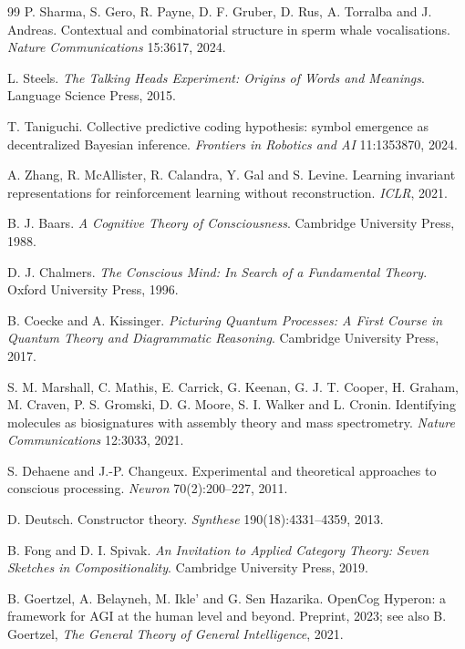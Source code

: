 \begin{thebibliography}{99}
 P. Sharma, S. Gero, R. Payne, D. F. Gruber, D. Rus, A. Torralba and
J. Andreas. Contextual and combinatorial structure in sperm whale vocalisations.
\emph{Nature Communications} 15:3617, 2024.

 L. Steels. \emph{The Talking Heads Experiment: Origins of Words and
Meanings}. Language Science Press, 2015.

 T. Taniguchi. Collective predictive coding hypothesis: symbol
emergence as decentralized Bayesian inference. \emph{Frontiers in Robotics and AI}
11:1353870, 2024.

 A. Zhang, R. McAllister, R. Calandra, Y. Gal and S. Levine. Learning
invariant representations for reinforcement learning without reconstruction. \emph{ICLR},
2021.


 B. J. Baars. \emph{A Cognitive Theory of Consciousness}. Cambridge
University Press, 1988.

 D. J. Chalmers. \emph{The Conscious Mind: In Search of a
Fundamental Theory}. Oxford University Press, 1996.

 B. Coecke and A. Kissinger. \emph{Picturing Quantum
Processes: A First Course in Quantum Theory and Diagrammatic Reasoning}. Cambridge
University Press, 2017.

 S. M. Marshall, C. Mathis, E. Carrick, G. Keenan, G. J. T. Cooper,
H. Graham, M. Craven, P. S. Gromski, D. G. Moore, S. I. Walker and L. Cronin.
Identifying molecules as biosignatures with assembly theory and mass spectrometry.
\emph{Nature Communications} 12:3033, 2021.

 S. Dehaene and J.-P. Changeux. Experimental and theoretical
approaches to conscious processing. \emph{Neuron} 70(2):200--227, 2011.

 D. Deutsch. Constructor theory. \emph{Synthese}
190(18):4331--4359, 2013.

 B. Fong and D. I. Spivak. \emph{An Invitation to Applied
Category Theory: Seven Sketches in Compositionality}. Cambridge University Press, 2019.

 B. Goertzel, A. Belayneh, M. Ikle' and G. Sen Hazarika. OpenCog
Hyperon: a framework for AGI at the human level and beyond. Preprint, 2023; see also
B. Goertzel, \emph{The General Theory of General Intelligence}, 2021.


\end{thebibliography}
